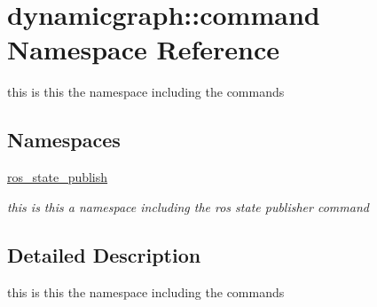 \hypertarget{namespacedynamicgraph_1_1command}{}\section{dynamicgraph\+:\+:command Namespace Reference}
\label{namespacedynamicgraph_1_1command}


this is this the namespace including the commands  


\subsection*{Namespaces}
\begin{DoxyCompactItemize}
\item 
 \hyperlink{namespacedynamicgraph_1_1command_1_1ros__state__publish}{ros\+\_\+state\+\_\+publish}
\begin{DoxyCompactList}\small\item\em this is this a namespace including the ros state publisher command \end{DoxyCompactList}\end{DoxyCompactItemize}


\subsection{Detailed Description}
this is this the namespace including the commands 